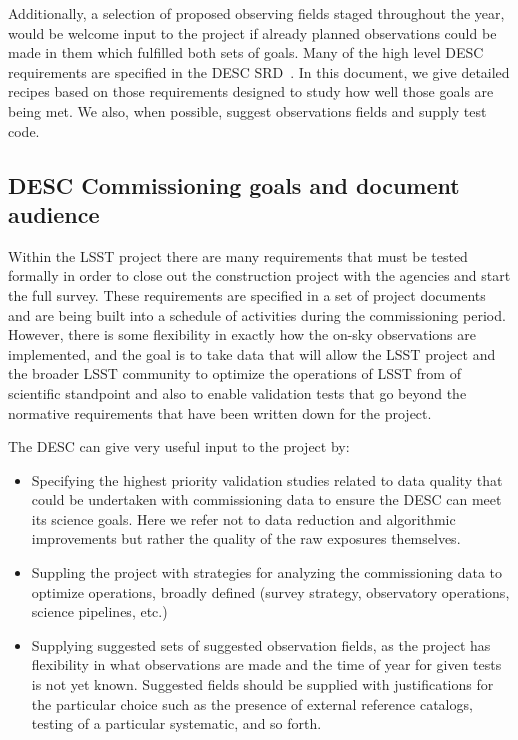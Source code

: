 \documentclass[modern]{desc-tex/styles/lsstdescnote}
\begin{document}
Additionally, a selection of proposed observing fields staged throughout the year, would be welcome input to the project if already planned observations could be made in them which fulfilled both sets of goals.  Many of the high level DESC requirements are specified in the DESC SRD~\cite{DESC-SRD}.  In this document, we  give detailed recipes based on those requirements designed to study how well those goals are being met. We also, when possible, suggest observations fields and supply test code.

\subsection{DESC Commissioning goals and document audience}

Within the LSST project there are many requirements that must be tested formally in order to close out the construction project with the agencies and start the full survey. These requirements are specified in a set of project documents and are being built into a schedule of activities during the commissioning period. However, there is some flexibility in exactly how the on-sky observations are implemented, and the goal is to take data that will allow the LSST project and  the broader LSST community to optimize the operations of LSST from of scientific standpoint and also to enable validation tests that go beyond the normative requirements that have been written down for the project.

The DESC can give very useful input to the project by:

\begin{itemize}

\item  Specifying the highest priority validation studies related to data quality that could be undertaken with commissioning data to ensure the DESC can meet its science goals.  Here we refer not to data reduction and algorithmic improvements but rather the quality of the raw exposures themselves.

\item Suppling the project with strategies for analyzing the commissioning data to optimize operations, broadly defined (survey strategy, observatory operations, science pipelines, etc.)

\item Supplying suggested sets of suggested observation fields, as the project has flexibility in what observations are made and the time of year for given tests is not yet known.  Suggested fields should be supplied with justifications for the particular choice such as the presence of external reference catalogs, testing of a particular systematic, and so forth.
  
\end{itemize}
\end{document}
